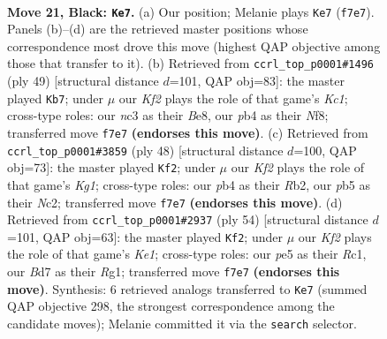 \documentclass[11pt]{article}
\begin{document}
\clearpage

\begin{figure}[p]\centering
\begin{subfigure}{0.46\textwidth}\centering
\resizebox{\linewidth}{!}{%
\newchessgame
\chessboard[
  setfen={rn6/pp1b1k2/1p2p1p1/1P1pP3/1P1P1rpR/2N5/8/3QKBN1 b - - 0 21},
  showmover=false,
  pgfstyle=straightmove, color=movearrow, markmove={f7-e7}
]}
\caption{}
\end{subfigure}\hfill
\begin{subfigure}{0.46\textwidth}\centering
\resizebox{\linewidth}{!}{%
\newchessgame
\chessboard[
  setfen={2k1bn1r/2p2pp1/1p6/r2NPPNp/p1P3P1/R5KP/2P5/5R2 b - - 0 25},
  showmover=false,
  pgfstyle=straightmove, color=movearrow, markmove={c8-b7}
]}
\caption{}
\end{subfigure}
\\[4pt]
\begin{subfigure}{0.46\textwidth}\centering
\resizebox{\linewidth}{!}{%
\newchessgame
\chessboard[
  setfen={2r3k1/5p1p/n2b2p1/B2p1p2/1p1P4/1P2PP2/1RNn2PP/2N3K1 w - - 1 25},
  showmover=false,
  pgfstyle=straightmove, color=movearrow, markmove={g1-f2}
]}
\caption{}
\end{subfigure}\hfill
\begin{subfigure}{0.46\textwidth}\centering
\resizebox{\linewidth}{!}{%
\newchessgame
\chessboard[
  setfen={4bk2/p5pp/2p2n1q/3pp3/3P3P/2P1NPP1/PP2B3/2R1K1R1 w - - 4 28},
  showmover=false,
  pgfstyle=straightmove, color=movearrow, markmove={e1-f2}
]}
\caption{}
\end{subfigure}
\caption{\textbf{Move 21, Black: \texttt{Ke7}.} (a) Our position; Melanie plays \texttt{Ke7} (\texttt{f7e7}). Panels (b)--(d) are the retrieved master positions whose correspondence most drove this move (highest QAP objective among those that transfer to it). (b) Retrieved from \texttt{ccrl\_top\_p0001\#1496} (ply 49) [structural distance $d$=101, QAP obj=83]: the master played \texttt{Kb7}; under $\mu$ our \emph{Kf2} plays the role of that game's \emph{Kc1}; cross-type roles: our \emph{n}c3 as their \emph{B}e8, our \emph{p}b4 as their \emph{N}f8; transferred move \texttt{f7e7} \textbf{(endorses this move)}. (c) Retrieved from \texttt{ccrl\_top\_p0001\#3859} (ply 48) [structural distance $d$=100, QAP obj=73]: the master played \texttt{Kf2}; under $\mu$ our \emph{Kf2} plays the role of that game's \emph{Kg1}; cross-type roles: our \emph{p}b4 as their \emph{R}b2, our \emph{p}b5 as their \emph{N}c2; transferred move \texttt{f7e7} \textbf{(endorses this move)}. (d) Retrieved from \texttt{ccrl\_top\_p0001\#2937} (ply 54) [structural distance $d$=101, QAP obj=63]: the master played \texttt{Kf2}; under $\mu$ our \emph{Kf2} plays the role of that game's \emph{Ke1}; cross-type roles: our \emph{p}e5 as their \emph{R}c1, our \emph{B}d7 as their \emph{R}g1; transferred move \texttt{f7e7} \textbf{(endorses this move)}. Synthesis: 6 retrieved analogs transferred to \texttt{Ke7} (summed QAP objective 298, the strongest correspondence among the candidate moves); Melanie committed it via the \texttt{search} selector.}
\label{fig:thought-m41}
\end{figure}
\end{document}
